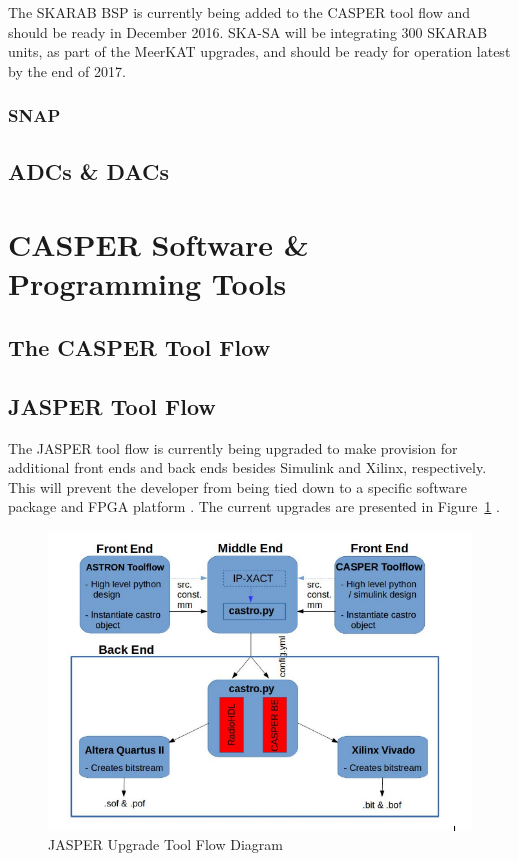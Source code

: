 \documentclass{ws-jai}
\begin{document}
The SKARAB BSP is currently being added to the CASPER tool flow and should be ready in December 2016.
SKA-SA will be integrating 300 SKARAB units, as part of the MeerKAT upgrades, and should be ready for operation latest by the end of 2017.


\subsubsection{SNAP}

\subsection{ADCs \& DACs}


\section{CASPER Software \& Programming Tools} \label{sec:Software}

\subsection{The CASPER Tool Flow}


\subsection{JASPER Tool Flow}


The JASPER tool flow is currently being upgraded to make provision for additional front ends and back ends besides Simulink and Xilinx, respectively. This will prevent the developer from being tied down to a specific software package and FPGA platform \cite{Isaac16}. The current upgrades are presented in Figure~\ref{fig:jasper_ug_bd} \cite{Isaac16}.

\begin{figure}[h]
\centering
\includegraphics[width=150mm, scale=0.5]{jasper_ug_bd}
\caption{JASPER Upgrade Tool Flow Diagram}
\label{fig:jasper_ug_bd}
\end{figure}  
\end{document}
